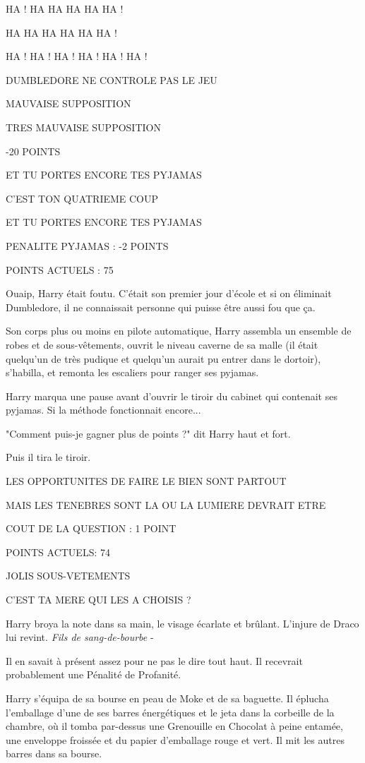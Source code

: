 HA ! HA HA HA HA HA !

HA HA HA HA HA HA !

HA ! HA ! HA ! HA ! HA ! HA !

DUMBLEDORE NE CONTROLE PAS LE JEU

MAUVAISE SUPPOSITION

TRES MAUVAISE SUPPOSITION

-20 POINTS

ET TU PORTES ENCORE TES PYJAMAS

C'EST TON QUATRIEME COUP

ET TU PORTES ENCORE TES PYJAMAS

PENALITE PYJAMAS : -2 POINTS

POINTS ACTUELS : 75

Ouaip, Harry était foutu. C'était son premier jour d'école et si on éliminait Dumbledore, il ne connaissait personne qui puisse être aussi fou que ça.

Son corps plus ou moins en pilote automatique, Harry assembla un ensemble de robes et de sous-vêtements, ouvrit le niveau caverne de sa malle (il était quelqu'un de très pudique et quelqu'un aurait pu entrer dans le dortoir), s'habilla, et remonta les escaliers pour ranger ses pyjamas.

Harry marqua une pause avant d'ouvrir le tiroir du cabinet qui contenait ses pyjamas. Si la méthode fonctionnait encore...

"Comment puis-je gagner plus de points ?" dit Harry haut et fort.

Puis il tira le tiroir.

LES OPPORTUNITES DE FAIRE LE BIEN SONT PARTOUT

MAIS LES TENEBRES SONT LA OU LA LUMIERE DEVRAIT ETRE

COUT DE LA QUESTION : 1 POINT

POINTS ACTUELS: 74

JOLIS SOUS-VETEMENTS

C'EST TA MERE QUI LES A CHOISIS ?

Harry broya la note dans sa main, le visage écarlate et brûlant. L'injure de Draco lui revint. \emph{Fils de sang-de-bourbe}  -

Il en savait à présent assez pour ne pas le dire tout haut. Il recevrait probablement une Pénalité de Profanité.

Harry s'équipa de sa bourse en peau de Moke et de sa baguette. Il éplucha l'emballage d'une de ses barres énergétiques et le jeta dans la corbeille de la chambre, où il tomba par-dessus une Grenouille en Chocolat à peine entamée, une enveloppe froissée et du papier d'emballage rouge et vert. Il mit les autres barres dans sa bourse.

